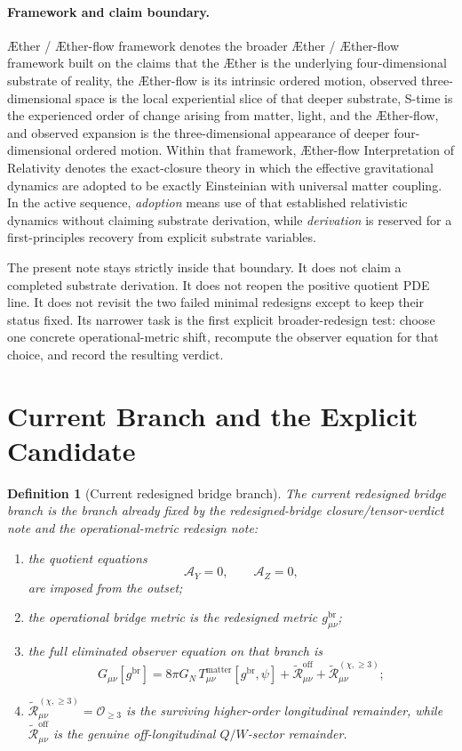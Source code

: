 \documentclass[11pt]{article}
\newcommand{\Aether}{\AE{}ther}
\newcommand{\Aflow}{\AE{}ther-flow}
\newcommand{\TheoryName}{\Aflow{} Interpretation of Relativity}
\newcommand{\TheoryProgram}{\Aether{} / \Aflow{} framework}
\newcommand{\ReBridge}{g^{\mathrm{br}}}
\newcommand{\ReOff}{\widetilde{\mathcal R}_{\mu\nu}^{\mathrm{off}}}
\newcommand{\ReLong}{\widetilde{\mathcal R}_{\mu\nu}^{(\chi,\ge 3)}}
\newcommand{\AY}{\mathcal A_Y}
\newcommand{\AZ}{\mathcal A_Z}
\newtheorem{definition}{Definition}
\begin{document}
\paragraph{Framework and claim boundary.}
\TheoryProgram{} denotes the broader \Aether{} / \Aflow{} framework built on the claims that the \Aether{} is the underlying four-dimensional substrate of reality, the \Aflow{} is its intrinsic ordered motion, observed three-dimensional space is the local experiential slice of that deeper substrate, S-time is the experienced order of change arising from matter, light, and the \Aflow{}, and observed expansion is the three-dimensional appearance of deeper four-dimensional ordered motion. Within that framework, \TheoryName{} denotes the exact-closure theory in which the effective gravitational dynamics are adopted to be exactly Einsteinian with universal matter coupling. In the active sequence, \emph{adoption} means use of that established relativistic dynamics without claiming substrate derivation, while \emph{derivation} is reserved for a first-principles recovery from explicit substrate variables.

The present note stays strictly inside that boundary. It does not claim a completed substrate derivation. It does not reopen the positive quotient PDE line. It does not revisit the two failed minimal redesigns except to keep their status fixed. Its narrower task is the first explicit broader-redesign test: choose one concrete operational-metric shift, recompute the observer equation for that choice, and record the resulting verdict.

\section{Current Branch and the Explicit Candidate}

\begin{definition}[Current redesigned bridge branch]
\label{def:current}
The \emph{current redesigned bridge branch} is the branch already fixed by the redesigned-bridge closure/tensor-verdict note and the operational-metric redesign note:
\begin{enumerate}
    \item the quotient equations
    \begin{equation}
    \AY=0,
    \qquad
    \AZ=0,
    \label{eq:AYAZ}
    \end{equation}
    are imposed from the outset;
    \item the operational bridge metric is the redesigned metric \(\ReBridge_{\mu\nu}\);
    \item the full eliminated observer equation on that branch is
    \begin{equation}
    G_{\mu\nu}[\ReBridge]
    =
    8\pi G_N\,T_{\mu\nu}^{\mathrm{matter}}[\ReBridge,\psi]
    +\ReOff+\ReLong;
    \label{eq:oldobs}
    \end{equation}
    \item \(\ReLong=\mathcal O_{\ge 3}\) is the surviving higher-order longitudinal remainder, while \(\ReOff\) is the genuine off-longitudinal \(Q/W\)-sector remainder.
\end{enumerate}
\end{definition}
\end{document}
